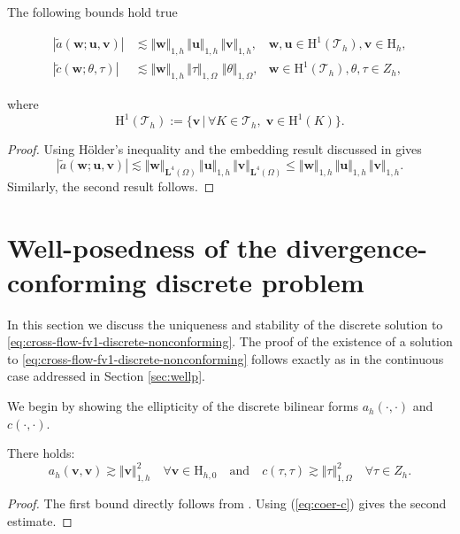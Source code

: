 \documentclass[onefignum,onetabnum,reqno,a4paper,final]{siamart250211}
\newcommand\bu{\boldsymbol{u}}
\newcommand\bv{\boldsymbol{v}}
\newcommand\bw{\boldsymbol{w}}
\newcommand\bL{\mathbf{L}}
\newcommand\0{\mathbf{0}}
\newcommand\bH{\boldsymbol{\mathrm{H}}}
\numberwithin{figure}{section}
\numberwithin{table}{section}
\begin{document}
 \begin{lemma}
  The following bounds hold true
	\begin{linenomath}
	\begin{subequations}
		\begin{align}
			|\widetilde{a}(\bw;\bu,\bv)|&\lesssim \Vert\bw\Vert_{1,h}\,\Vert\bu\Vert_{1,h}\,\Vert\bv\Vert_{1,h},&\bw,\bu \in \bH^1(\mathcal{T}_h),\bv\in \bH_h,\label{eq:discrete-widetilde_a}\\
			|\widetilde{c}(\bw;\theta,\tau)|&\lesssim \Vert\bw\Vert_{1,h}\,\Vert\tau\Vert_{1,\Omega}\, \,\Vert\theta\Vert_{1,\Omega},&\bw\in\bH^1(\mathcal{T}_h),\theta,\tau\in Z_h\label{eq:discrete-widetilde_c},
\end{align}\end{subequations}\end{linenomath}
where
$$ 
\bH^1(\mathcal{T}_h) := \{\bv\,| \,\forall K\in\mathcal{T}_h,\; \bv\in \bH^1(K)\}.  $$
\end{lemma}
\begin{proof}
Using H\"older's inequality and the embedding result discussed in \cite{buffa2009compact}  gives 
$$
    |\widetilde{a}(\bw;\bu,\bv)|\lesssim \Vert\bw\Vert_{\bL^4(\Omega)}\,\Vert\bu\Vert_{1,h}\,\Vert\bv\Vert_{\bL^4(\Omega)}\leq\Vert\bw\Vert_{1,h}\,\Vert\bu\Vert_{1,h}\,\Vert\bv\Vert_{1,h}. 
$$
Similarly, the second result follows.
\end{proof}

	\section{Well-posedness of the divergence-conforming discrete problem}\label{sec:discrete-wellp}
	In this section we discuss the uniqueness and stability of the discrete solution to \eqref{eq:cross-flow-fv1-discrete-nonconforming}. The proof of the existence of a solution to \eqref{eq:cross-flow-fv1-discrete-nonconforming} follows exactly as in the continuous case addressed in Section \ref{sec:wellp}.
    
We begin by showing the ellipticity of the discrete bilinear forms $a_h(\cdot,\cdot)$ and $c(\cdot,\cdot)$. 
       \begin{lemma}\label{lem:B-discoer}
        There holds:
        $$
            a_h(\bv,\bv)\gtrsim \Vert\bv\Vert_{1,h}^2\quad \forall \bv\in {\bH_{h,0}}
            \quad \mbox{and}\quad c(\tau,\tau)\gtrsim \Vert\tau\Vert_{1,\Omega}^2\quad \forall \tau\in Z_h.
        $$
        \end{lemma}
        \begin{proof}
        The first bound directly follows from \cite[Prop. 10]{hansbo2002discontinuous}. Using (\ref{eq:coer-c}) gives the second estimate.
        \end{proof}
        
\end{document}

